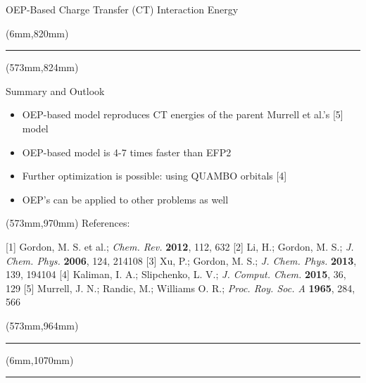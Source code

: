 \documentclass[final]{beamer} %
\begin{document}
\begin{frame}{OEP-Based Charge Transfer (CT) Interaction Energy}
\begin{textblock*}{820mm}(6mm,820mm)
\noindent\rule{83cm}{5.4pt}
\end{textblock*}


\begin{textblock*}{257mm}(573mm,824mm)
\begin{block}{Summary and Outlook}
 \begin{itemize}
   \item OEP-based model reproduces CT energies of the parent Murrell et al.'s [5] model
   \item OEP-based model is 4-7 times faster than EFP2
   \item Further optimization is possible: using QUAMBO orbitals [4]
   \item OEP's can be applied to other problems as well
 \end{itemize}
\end{block}
\end{textblock*}

\begin{textblock*}{257mm}(573mm,970mm)
    References: %
    \begin{small}
[1] Gordon, M. S. et al.; \emph{Chem. Rev.} {\bf{\small 2012}}, 112, 632 
[2] Li, H.; Gordon, M. S.; \emph{J. Chem. Phys.} {\bf{\small 2006}}, 124, 214108
[3] Xu, P.; Gordon, M. S.; \emph{J. Chem. Phys.} {\bf{\small 2013}}, 139, 194104
[4] Kaliman, I. A.; Slipchenko, L. V.; \emph{J. Comput. Chem.} {\bf{\small 2015}}, 36, 129
[5] Murrell, J. N.; Randic, M.; Williams O. R.; \emph{Proc. Roy. Soc. A} {\bf{\small 1965}}, 284, 566
    \end{small}         
\end{textblock*}
\begin{textblock*}{257mm}(573mm,964mm)
\noindent\rule{83cm}{5.4pt}
\end{textblock*}


\begin{textblock*}{820mm}(6mm,1070mm)
\noindent\rule{83cm}{5.4pt}
\end{textblock*}



\end{frame}
\end{document}
